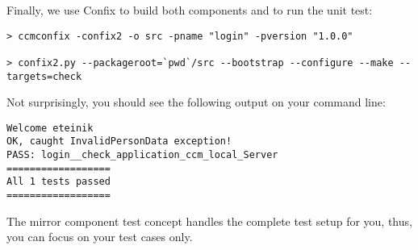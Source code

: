 \vspace{3mm}
Finally, we use Confix to build both components and to run the unit test:
\begin{footnotesize}
\begin{verbatim}
> ccmconfix -confix2 -o src -pname "login" -pversion "1.0.0"

> confix2.py --packageroot=`pwd`/src --bootstrap --configure --make --targets=check
\end{verbatim}
\end{footnotesize}
Not surprisingly, you should see the following output on your command line:
\begin{footnotesize}
\begin{verbatim}
Welcome eteinik
OK, caught InvalidPersonData exception!
PASS: login__check_application_ccm_local_Server
==================
All 1 tests passed
==================
\end{verbatim}
\end{footnotesize}

The mirror component test concept handles the complete test setup for you, thus,
you can focus on your test cases only.

\newpage

